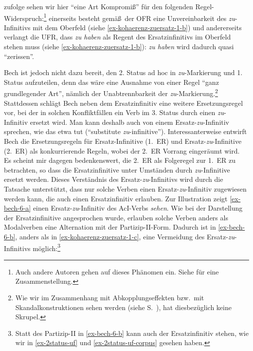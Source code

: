 \cite{Bech:63} zufolge sehen wir hier "`eine Art Kompromi\ss "' für den folgenden Regel-Wider\-spruch:\footnote{Auch andere Autoren gehen auf dieses Phänomen ein. Siehe \citet[70]{Meurers:99} für eine Zusammenstellung.} einerseits besteht gemä\ss\ der OFR eine Unvereinbarkeit des \emph{zu}-Infinitivs mit dem Oberfeld (siehe \ref{ex-kohaerenz-zuersatz-1-b}) und andererseits verlangt die UFR, dass {\it zu haben} als Regent des Ersatzinfinitivs im Oberfeld stehen muss (siehe \ref{ex-kohaerenz-zuersatz-1-b}): {\it zu haben} wird dadurch quasi "`zerissen"'. 

Bech ist jedoch nicht dazu bereit, den 2. Status ad hoc in {\it zu}-Markierung und 1. Status aufzuteilen, denn das wäre eine Ausnahme von einer Regel "`ganz grundlegender Art"', nämlich der Unabtrennbarkeit der {\it zu}-Markierung.\footnote{Wie wir im Zusammenhang mit Abkopplungseffekten bzw.\ mit Skandalkonstruktionen sehen werden (siehe S.~\pageref{sec-skandal}), hat \cite{Vogel:09} diesbezüglich keine Skrupel.} Stattdessen schlägt Bech neben dem Ersatzinfinitiv eine weitere Ersetzungsregel vor, bei der in solchen Konfliktfällen ein Verb im 3. Status durch einen \emph{zu}-Infinitiv ersetzt wird. Man kann deshalb auch von einem Ersatz-\emph{zu}-Infinitiv sprechen, wie das etwa \citet[70ff]{Meurers:99} tut ("`substitute \emph{zu}-infinitive"'). Interessanterweise entwirft Bech die Ersetzungsregeln für Ersatz-Infinitive (1.~ER) und Ersatz-\emph{zu}-Infinitive (2.~ER) als konkurrierende Regeln, wobei der 2.~ER Vorrang eingeräumt wird. Es scheint  mir dagegen bedenkenswert, die 2.~ER als Folgeregel zur 1.~ER zu betrachten, so dass die Ersatzinfinitive unter Umständen durch \emph{zu}-Infinitive ersetzt werden. Dieses Verständnis des Ersatz-\emph{zu}-Infinitivs wird durch die Tatsache unterstützt, dass nur solche Verben einen Ersatz-\emph{zu}-Infinitiv zugewiesen werden kann, die auch einen Ersatzinfinitiv erlauben. Zur Illustration zeigt \ref{ex-bech-6-a} einen Ersatz-\emph{zu}-Infinitiv des AcI-Verbs {\it sehen}. Wie bei der Darstellung der Ersatzinfinitive angesprochen wurde, erlauben solche Verben anders als Modalverben eine Alternation mit der Partizip-II-Form. Dadurch ist in \ref{ex-bech-6-b}, anders als in \ref{ex-kohaerenz-zuersatz-1-c}, eine Vermeidung des Ersatz-\emph{zu}-Infinitivs möglich:\footnote{Statt des Partizip-II in \ref{ex-bech-6-b} kann auch der Ersatzinfinitiv stehen, wie wir in \ref{ex-2status-uf} und \ref{ex-2status-uf-corpus} gesehen haben.}

